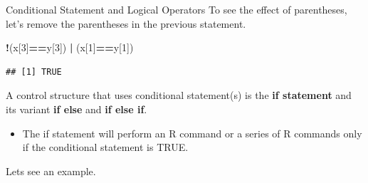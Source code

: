 \documentclass[
  ignorenonframetext,
]{beamer}
\newenvironment{Shaded}{\begin{snugshade}}{\end{snugshade}}
\newcommand{\DecValTok}[1]{\textcolor[rgb]{0.00,0.00,0.81}{#1}}
\newcommand{\NormalTok}[1]{#1}
\newcommand{\SpecialCharTok}[1]{\textcolor[rgb]{0.81,0.36,0.00}{\textbf{#1}}}
\providecommand{\tightlist}{%
  \setlength{\itemsep}{0pt}\setlength{\parskip}{0pt}}
\begin{document}
\begin{frame}[fragile]{Conditional Statement and Logical Operators}
\protect\hypertarget{conditional-statement-and-logical-operators-2}{}
To see the effect of parentheses, let's remove the parentheses in the
previous statement. \small

\begin{Shaded}
\begin{Highlighting}[]
\SpecialCharTok{!}\NormalTok{(x[}\DecValTok{3}\NormalTok{]}\SpecialCharTok{==}\NormalTok{y[}\DecValTok{3}\NormalTok{]) }\SpecialCharTok{|}\NormalTok{ (x[}\DecValTok{1}\NormalTok{]}\SpecialCharTok{==}\NormalTok{y[}\DecValTok{1}\NormalTok{])}
\end{Highlighting}
\end{Shaded}

\begin{verbatim}
## [1] TRUE
\end{verbatim}

\normalsize

A control structure that uses conditional statement(s) is the \textbf{if
statement} and its variant \textbf{if else} and \textbf{if else if}.

\begin{itemize}
\tightlist
\item
  The if statement will perform an R command or a series of R commands
  only if the conditional statement is TRUE.
\end{itemize}

Lets see an example.
\end{frame}
\end{document}
